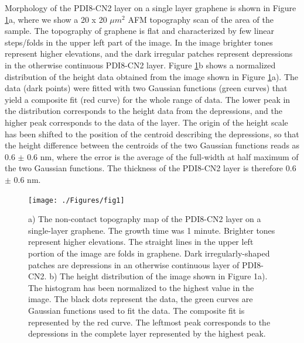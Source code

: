 \documentclass[preprint,aip,jap]{revtex4-2}
\begin{document}
Morphology of the PDI8-CN2 layer on a single layer graphene is shown in Figure \ref{fig:1}a, where we show a 20 x 20 $\mu m^2$ AFM topography scan of the area of the sample.
The topography of graphene is flat and characterized by few linear steps/folds in the upper left part of the image.
 In the image brighter tones represent higher elevations, and the dark irregular patches represent depressions in the otherwise continuous PDI8-CN2 layer.
 Figure \ref{fig:1}b  shows a normalized distribution of the height data obtained from the image shown in Figure \ref{fig:1}a).
 The data (dark points) were fitted with two Gaussian functions (green curves) that yield a composite fit (red curve) for the whole range of data.
 The lower peak in the distribution corresponds to the height data from the depressions, and the higher peak corresponds to the data of the layer.
 The origin of the height scale has been shifted to the position of the centroid describing the depressions, so that the height difference between the centroids of the two Gaussian functions reads as 0.6 $\pm$ 0.6 nm, where the error is the average of the full-width at half maximum of the two Gaussian functions.
  The thickness of the PDI8-CN2 layer is therefore 0.6 $\pm$ 0.6 nm.


\begin{figure}[htb]
  \centering
        \texttt{[image: ./Figures/fig1]}
  \caption{a) The non-contact topography map of the PDI8-CN2 layer on a single-layer graphene.
 The growth time was 1 minute.
 Brighter tones represent higher elevations.
 The straight lines in the upper left portion of the image are folds in graphene.
 Dark irregularly-shaped patches are depressions in an otherwise continuous layer of PDI8-CN2.
  b) The height distribution of the image shown in Figure 1a).
 The histogram has been normalized to the highest value in the image.
 The black dots represent the data, the green curves are Gaussian functions used to fit the data.
 The composite fit is represented by the red curve.
 The leftmost peak corresponds to the depressions in the complete layer represented by the highest peak.
}
  \label{fig:1}
\end{figure}
\end{document}
